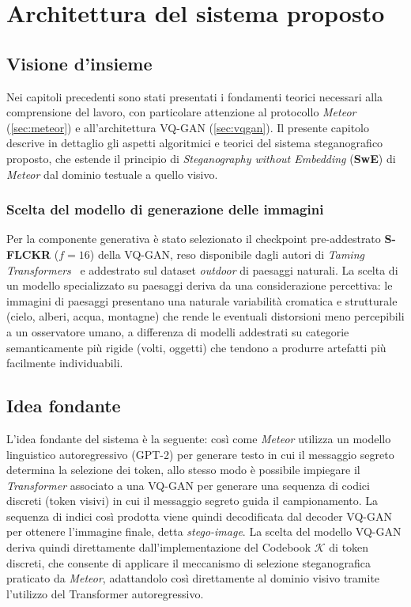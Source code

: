 
\chapter{Architettura del sistema proposto}
\label{ch:proposta}

\section{Visione d'insieme}
\label{sec:visione-insieme}

Nei capitoli precedenti sono stati presentati i fondamenti teorici necessari alla comprensione del lavoro, con particolare attenzione al protocollo \emph{Meteor} (\autoref{sec:meteor}) e all'architettura VQ-GAN (\autoref{sec:vqgan}). Il presente capitolo descrive in dettaglio gli aspetti algoritmici e teorici del sistema steganografico proposto, che estende il principio di \emph{Steganography without Embedding} (\textbf{SwE}) di \emph{Meteor} dal dominio testuale a quello visivo.

\subsection{Scelta del modello di generazione delle immagini}

Per la componente generativa è stato selezionato il checkpoint pre-addestrato \textbf{S-FLCKR} ($f=16$) della VQ-GAN, reso disponibile dagli autori di \emph{Taming Transformers}~\cite{esser-2020} e addestrato sul dataset \emph{outdoor} di paesaggi naturali. La scelta di un modello specializzato su paesaggi deriva da una considerazione percettiva: le immagini di paesaggi presentano una naturale variabilità cromatica e strutturale (cielo, alberi, acqua, montagne) che rende le eventuali distorsioni meno percepibili a un osservatore umano, a differenza di modelli addestrati su categorie semanticamente più rigide (volti, oggetti) che tendono a produrre artefatti più facilmente individuabili.

\section{Idea fondante}
\label{sec:idea-fondante}

L'idea fondante del sistema è la seguente: così come \emph{Meteor} utilizza un modello linguistico autoregressivo (GPT-2) per generare testo in cui il messaggio segreto determina la selezione dei token, allo stesso modo è possibile impiegare il \emph{Transformer} associato a una VQ-GAN per generare una sequenza di codici discreti (token visivi) in cui il messaggio segreto guida il campionamento. La sequenza di indici così prodotta viene quindi decodificata dal decoder VQ-GAN per ottenere l'immagine finale, detta \emph{stego-image}.
La scelta del modello VQ-GAN deriva quindi direttamente dall'implementazione del Codebook $\mathcal{K}$ di token discreti, che consente di applicare il meccanismo di selezione steganografica praticato da \emph{Meteor}, adattandolo così direttamente al dominio visivo tramite l'utilizzo del Transformer autoregressivo.

